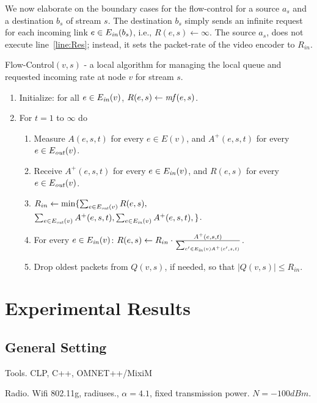 \documentclass[12pt]{article}
\newenvironment{proof sketch}[1]{\noindent {\emph{Proof sketch of #1:}}}{\hfill \qed}
\newcommand{\mf}{\text{\emph{mf}}}
\newcommand{\Ein}{E_{\text{\emph{in}}}}
\newcommand{\Eout}{E_{\text{\emph{out}}}}
\begin{document}
We now elaborate on the boundary cases for the flow-control for a
source $a_s$ and a destination $b_s$ of stream $s$.  The destination
$b_s$ simply sends an infinite request for each incoming link $e\in \Ein(b_s)$, i.e.,
$R(e,s)\gets \infty$.  The source $a_s$, does not execute
line~\ref{line:Res}; instead, it sets the packet-rate of the video
encoder to $R_{in}$.


\begin{algorithm}
  \caption{Flow-Control$(v,s)$ - a local algorithm for managing the
    local queue and requested incoming rate at node $v$ for stream
    $s$.}
\label{alg:FC}
  \begin{enumerate}
  \item Initialize: for all $e\in \Ein(v)$, $R(e,s)\gets \mf(e,s)$.
  \item For $t=1$ to $\infty$ do
    \begin{enumerate}
    \item Measure $A(e,s,t)$ for every $e\in E(v)$, and $A^+(e,s,t)$ for every $e\in\Eout(v)$.
    \item Receive $A^+(e,s,t)$ for every $e\in\Ein(v)$, and $R(e,s)$ for every $e\in \Eout(v)$.
    \item \label{line:Rin}
$R_{in} \gets \min\{\sum_{e\in\Eout(v)} R(e,s),$\\
$ \sum_{e\in\Eout(v)} A^+(e,s,t), \sum_{e\in\Ein(v)} A^+(e,s,t),
            \}$.
          \item \label{line:Res}
For every $e\in\Ein(v)$: $R(e,s) \gets R_{in} \cdot
            \frac{A^+(e,s,t)}{\sum_{e'\in\Ein(v) A^+(e',s,t)}}$.
            \item Drop oldest packets from $Q(v,s)$, if needed, so
              that $|Q(v,s)|\leq R_{in}$.
    \end{enumerate}
  \end{enumerate}
\end{algorithm}

\section{Experimental Results}
\subsection{General Setting}

Tools. CLP, C++, OMNET++/MixiM

Radio. Wifi 802.11g, radiuses., $\alpha=4.1$, fixed transmission power.
$N=-100dBm$.
\end{document}
